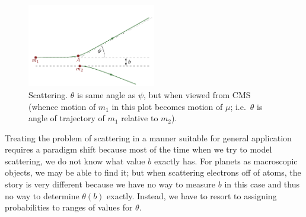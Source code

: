\documentclass[../class_mech_main.tex]{subfiles}
\begin{document}
\begin{figure}
	\centering

	\includegraphics[width=0.5\textwidth]{pictures/scattering.pdf}

	\caption{Scattering. $\theta$ is same angle as $\psi$, but when viewed from CMS (whence motion of $m_1$ in this plot becomes motion of $\mu$; i.e.~$\theta$ is angle of trajectory of $m_1$ relative to $m_2$).}
	\label{fig:scattering}
\end{figure}



Treating the problem of scattering in a manner suitable for general application requires a paradigm shift because most of the time when we try to model scattering, we do not know what value $b$ exactly has. For planets as macroscopic objects, we may be able to find it; but when scattering electrons off of atoms, the story is very different because we have no way to measure $b$ in this case and thus no way to determine $\theta(b)$ exactly. Instead, we have to resort to assigning probabilities to ranges of values for $\theta$.

\end{document}
